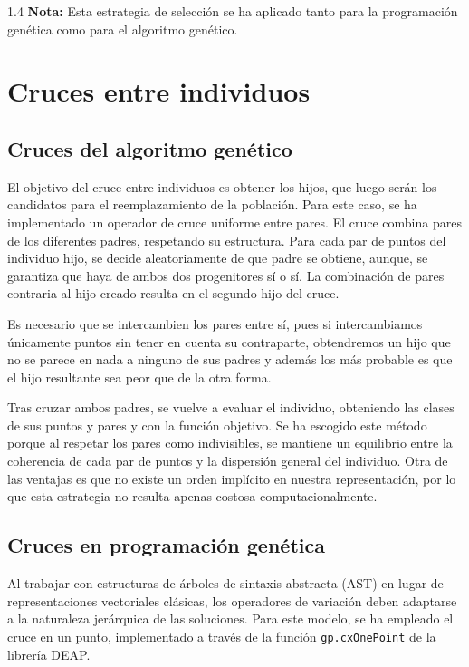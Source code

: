 \documentclass{article}
\begin{document}
\begin{spacing}{1.4}
\textbf{Nota:} Esta estrategia de selección se ha aplicado tanto para la programación genética
como para el algoritmo genético.

\section{Cruces entre individuos}
\subsection{Cruces del algoritmo genético}
El objetivo del cruce entre individuos es obtener los hijos, que luego serán los candidatos para el reemplazamiento de la población.
Para este caso, se ha implementado un operador de cruce uniforme entre pares. El cruce combina pares de los diferentes
padres, respetando su estructura. Para cada par de puntos del individuo hijo, se decide aleatoriamente de que padre se obtiene,
aunque, se garantiza que haya de ambos dos progenitores sí o sí. La combinación de pares contraria al hijo creado resulta en el
segundo hijo del cruce.

Es necesario que se intercambien los pares entre sí, pues si intercambiamos únicamente puntos sin tener en cuenta su contraparte,
obtendremos un hijo que no se parece en nada a ninguno de sus padres y además los más probable es que el hijo resultante sea peor que
de la otra forma.

Tras cruzar ambos padres, se vuelve a evaluar el individuo, obteniendo las clases de sus puntos y pares y
con la función objetivo. Se ha escogido este método porque al respetar los pares como indivisibles, se mantiene
un equilibrio entre la coherencia de cada par de puntos y la dispersión general del individuo. Otra de las ventajas es que no existe
un orden implícito en nuestra representación, por lo que esta estrategia no resulta apenas costosa computacionalmente.

\subsection{Cruces en programación genética}

Al trabajar con estructuras de árboles de sintaxis abstracta (AST) en lugar de representaciones vectoriales clásicas, los operadores de variación deben adaptarse a la naturaleza jerárquica de las soluciones. Para este modelo, se ha empleado el cruce en un punto, implementado a través de la función \texttt{gp.cxOnePoint} de la librería DEAP.


\end{spacing}
\end{document}

